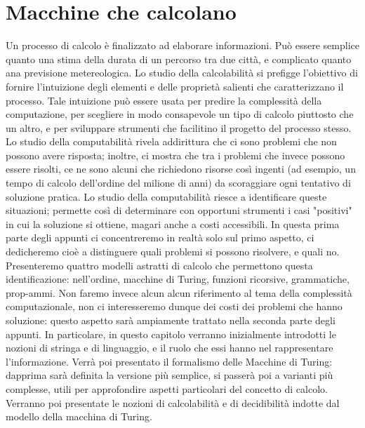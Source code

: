\section{Macchine che calcolano}

Un processo di calcolo è finalizzato ad elaborare informazioni.
Può essere semplice quanto una stima della durata di un percorso tra due città,
e complicato quanto ana previsione metereologica.
Lo studio della calcolabilità si prefigge l'obiettivo
di fornire l'intuizione degli elementi e delle proprietà salienti che
caratterizzano il processo.
Tale intuizione può essere usata per predire la complessità della computazione,
per scegliere in modo consapevole un tipo di calcolo piuttosto che un
altro, e per sviluppare strumenti che facilitino il progetto del processo stesso.
Lo studio della computabilità rivela addirittura che ci sono problemi che non
possono avere risposta; inoltre, ci mostra che tra i problemi che invece possono
essere risolti, ce ne sono alcuni che richiedono risorse così ingenti
(ad esempio, un tempo di calcolo dell'ordine del milione di anni) da scoraggiare
ogni tentativo di soluzione pratica. Lo studio della computabilità riesce a
identificare queste situazioni; permette così di determinare con opportuni
strumenti i casi "positivi" in cui la soluzione si ottiene, magari anche a
costi accessibili.
In questa prima parte degli appunti ci concentreremo in realtà solo sul primo aspetto,
ci dedicheremo cioè a distinguere quali problemi si possono risolvere, e quali no.
Presenteremo quattro modelli astratti di calcolo che permettono questa
identificazione: nell'ordine, macchine di Turing, funzioni ricorsive,
grammatiche, prop-ammi. Non faremo invece alcun alcun riferimento al tema
della complessità computazionale, non ci interesseremo dunque dei costi dei
problemi che hanno soluzione: questo aspetto sarà ampiamente trattato nella
seconda parte degli appunti.
In particolare, in questo capitolo verranno inizialmente introdotti le nozioni di
stringa e di linguaggio, e il ruolo che essi hanno nel rappresentare l'informazione.
Verrà poi presentato il formalismo delle Macchine di Turing: dapprima sarà
definita la versione più semplice, si passerà poi a varianti più complesse,
utili per approfondire aspetti particolari del concetto di calcolo.
Verranno poi presentate le nozioni di calcolabilità e di decidibilità
indotte dal modello della macchina di Turing.